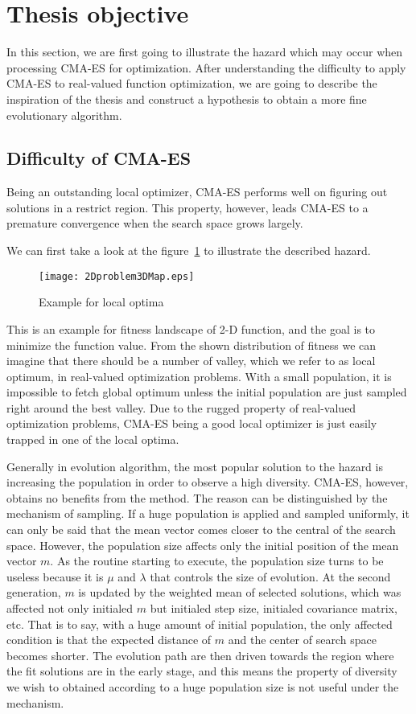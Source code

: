 \section{Thesis objective} \label{sec:motivation}

In this section, we are first going to illustrate the
hazard which may occur when processing CMA-ES for
optimization.
After understanding the difficulty to apply CMA-ES to real-valued
function optimization, we are going to describe the inspiration of the
thesis and construct a hypothesis to obtain a more fine evolutionary
algorithm.
\subsection{Difficulty of CMA-ES} Being an outstanding local optimizer,
CMA-ES performs well on figuring out solutions in a restrict region.
This property, however, leads CMA-ES to a premature convergence when the
search space grows largely. 

We can first take a look at the figure~\ref{fig:localExample} to
illustrate the described hazard.
\begin{figure}[h] \begin{center}
    \texttt{[image: 2Dproblem3DMap.eps]}
    \caption{Example for local optima}
    \label{fig:localExample} 
  \end{center} 
\end{figure}
This is an example for fitness landscape of 2-D
function, and the goal is to minimize the function
value.  From the shown distribution of fitness we can
imagine that there should be a number of valley, which
we refer to as local optimum, in real-valued
optimization problems.  With a small population, it is
impossible to fetch global optimum unless the initial
population are just sampled right around the best
valley.  Due to the rugged property of real-valued
optimization problems, CMA-ES being a good local
optimizer is just easily trapped in one of the local
optima.

  Generally in evolution algorithm, the most popular
  solution to the hazard is increasing the population
  in order to observe a high diversity.  CMA-ES,
  however, obtains no benefits from the method.  The
  reason can be distinguished by the mechanism of
sampling.  If a huge population is applied and
sampled uniformly, it can only be said that the mean
vector comes closer to the central of the search
space.  However, the population size affects only
the initial position of the mean vector $m$.  As the
routine starting to execute, the population size
turns to be useless because it is $\mu$ and
$\lambda$ that controls the size of evolution.  At
the second generation, $m$ is updated by the
weighted mean of selected solutions, which was
affected not only initialed $m$ but initialed step
size, initialed covariance matrix, etc.  That is to
say, with a huge amount of initial population, the
only affected condition is that the expected
distance of $m$ and the center of search space
becomes shorter.  The evolution path are then driven
towards the region where the fit solutions are in
the early stage, and this means the property of
diversity we wish to obtained according to a huge
population size is not useful under the mechanism.

